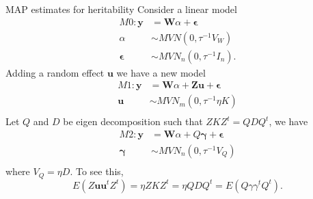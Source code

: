 \documentclass[]{beamer}
\def\y{{\bf y}}
\def\e{{\bf e}}
\def\u{{\bf u}}
\def\e{{\mathbf{\epsilon}}}
\def\u{{\mathbf{u}}}
\def\ga{{\mathbf{\gamma}}}
\def\y{{\mathbf{y}}}
\def\Z{{\mathbf{Z}}}
\def\W{{\mathbf{W}}}
\begin{document}
\begin{frame}{MAP estimates for heritability}
Consider a linear model 
\begin{equation} \label{M1}
\begin{aligned}
M0: \y &= \W \alpha  + \e \\
\alpha &\sim MVN(0,  \tau^{-1}  V_W) \\
\e &\sim MVN_n(0, \tau^{-1} I_n).
\end{aligned}
\end{equation}
Adding a random effect $\u$ we have a new model 
%
\begin{equation} \label{M2Z}
\begin{aligned}
M1: \y &= \W \alpha  + \Z \u + \e \\
\u &\sim MVN_m(0, \tau^{-1} \eta K) \\
\end{aligned}
\end{equation}
Let $Q$ and $D$ be eigen decomposition such that $ZKZ^t=QDQ^t$, we have %
\begin{equation} \label{M2}
\begin{aligned}
M2: \y &= \W \alpha  + Q \ga + \e \\
\ga &\sim MVN_n(0, \tau^{-1} V_Q) \\
\end{aligned}
\end{equation}
where $V_Q = \eta D$. To see this, $$E(Z\u\u^tZ^t) = \eta ZKZ^t = \eta QDQ^t = E(Q\gamma \gamma^t Q^t).$$ 
\end{frame}
\end{document}
